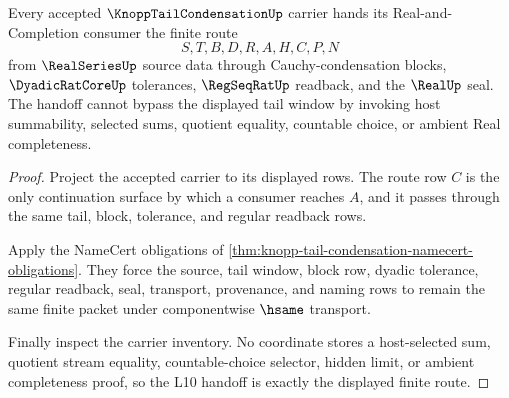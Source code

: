 \begin{theorem}
\label{thm:knopp-tail-condensation-l10-handoff}
Every accepted $\KnoppTailCondensationUp$ carrier hands its Real-and-Completion consumer the finite route
$$
S,T,B,D,R,A,H,C,P,N
$$
from $\RealSeriesUp$ source data through Cauchy-condensation blocks, $\DyadicRatCoreUp$ tolerances, $\RegSeqRatUp$ readback, and the $\RealUp$ seal. The handoff cannot bypass the displayed tail window by invoking host summability, selected sums, quotient equality, countable choice, or ambient Real completeness.
\end{theorem}
\begin{proof}
Project the accepted carrier to its displayed rows. The route row $C$ is the only continuation surface by which a consumer reaches $A$, and it passes through the same tail, block, tolerance, and regular readback rows.

Apply the NameCert obligations of \autoref{thm:knopp-tail-condensation-namecert-obligations}. They force the source, tail window, block row, dyadic tolerance, regular readback, seal, transport, provenance, and naming rows to remain the same finite packet under componentwise $\hsame$ transport.

Finally inspect the carrier inventory. No coordinate stores a host-selected sum, quotient stream equality, countable-choice selector, hidden limit, or ambient completeness proof, so the L10 handoff is exactly the displayed finite route.
\end{proof}



